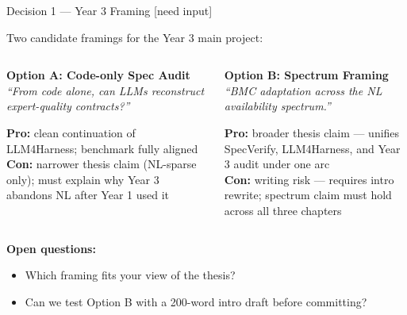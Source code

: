 \documentclass[aspectratio=169]{beamer}
\begin{document}
\begin{frame}{Decision 1 --- Year 3 Framing \quad\textcolor{myred}{\small[need input]}}

Two candidate framings for the Year 3 main project:

\bigskip
\begin{columns}[T]

\begin{block}{\textbf{Option A: Code-only Spec Audit}}
{\small
\emph{``From code alone, can LLMs reconstruct
expert-quality contracts?''}}

\medskip
{\small
\textcolor{mygreen}{\textbf{Pro:}} clean continuation of LLM4Harness;
benchmark fully aligned\\[4pt]
\textcolor{myred}{\textbf{Con:}} narrower thesis claim (NL-sparse only);
must explain why Year 3 abandons NL after Year 1 used it}
\end{block}

\begin{block}{\textbf{Option B: Spectrum Framing}}
{\small
\emph{``BMC adaptation across the NL availability spectrum.''}}

\medskip
{\small
\textcolor{mygreen}{\textbf{Pro:}} broader thesis claim --- unifies SpecVerify,
LLM4Harness, and Year 3 audit under one arc\\[4pt]
\textcolor{myred}{\textbf{Con:}} writing risk --- requires intro rewrite;
spectrum claim must hold across all three chapters}
\end{block}

\end{columns}

\bigskip
\textbf{Open questions:}
\begin{itemize}\small
  \item Which framing fits your view of the thesis?
  \item Can we test Option B with a 200-word intro draft before committing?
\end{itemize}

\end{frame}
\end{document}
